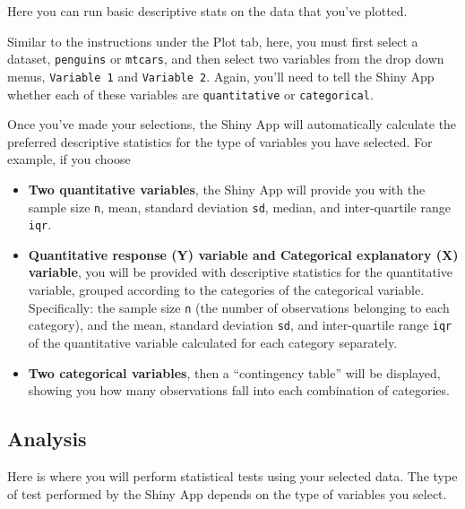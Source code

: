 \documentclass[
]{book}
\providecommand{\tightlist}{%
  \setlength{\itemsep}{0pt}\setlength{\parskip}{0pt}}
\begin{document}
Here you can run basic descriptive stats on the data that you've plotted.

Similar to the instructions under the Plot tab, here, you must first select a dataset, \texttt{penguins} or \texttt{mtcars}, and then select two variables from the drop down menus, \texttt{Variable\ 1} and \texttt{Variable\ 2}. Again, you'll need to tell the Shiny App whether each of these variables are \texttt{quantitative} or \texttt{categorical}.

Once you've made your selections, the Shiny App will automatically calculate the preferred descriptive statistics for the type of variables you have selected. For example, if you choose

\begin{itemize}
\tightlist
\item
  \textbf{Two quantitative variables}, the Shiny App will provide you with the sample size \texttt{n}, mean, standard deviation \texttt{sd}, median, and inter-quartile range \texttt{iqr}.
\item
  \textbf{Quantitative response (Y) variable and Categorical explanatory (X) variable}, you will be provided with descriptive statistics for the quantitative variable, grouped according to the categories of the categorical variable. Specifically: the sample size \texttt{n} (the number of observations belonging to each category), and the mean, standard deviation \texttt{sd}, and inter-quartile range \texttt{iqr} of the quantitative variable calculated for each category separately.
\item
  \textbf{Two categorical variables}, then a ``contingency table'' will be displayed, showing you how many observations fall into each combination of categories.
\end{itemize}

\hypertarget{analysis}{%
\subsection*{Analysis}\label{analysis}}

Here is where you will perform statistical tests using your selected data. The type of test performed by the Shiny App depends on the type of variables you select.
\end{document}
